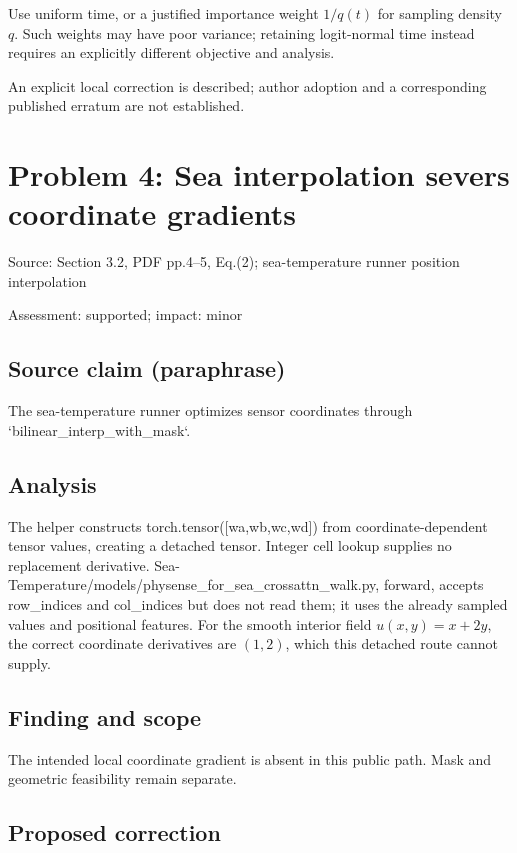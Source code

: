 \documentclass[11pt]{article}
\begin{document}
Use uniform time, or a justified importance weight \(1/q(t)\) for sampling density \(q\). Such weights may have poor variance; retaining logit-normal time instead requires an explicitly different objective and analysis.

An explicit local correction is described; author adoption and a corresponding published erratum are not established.

\section*{Problem 4: Sea interpolation severs coordinate gradients}

Source: Section 3.2, PDF pp.4–5, Eq.(2); sea-temperature runner position interpolation

Assessment: supported; impact: minor

\subsection*{Source claim (paraphrase)}

The sea-temperature runner optimizes sensor coordinates through `bilinear\_interp\_with\_mask`.

\subsection*{Analysis}

The helper constructs torch.tensor([wa,wb,wc,wd]) from coordinate-dependent tensor values, creating a detached tensor. Integer cell lookup supplies no replacement derivative. Sea-Temperature/models/physense\_for\_sea\_crossattn\_walk.py, forward, accepts row\_indices and col\_indices but does not read them; it uses the already sampled values and positional features. For the smooth interior field \(u(x,y)=x+2y\), the correct coordinate derivatives are \((1,2)\), which this detached route cannot supply.

\subsection*{Finding and scope}

The intended local coordinate gradient is absent in this public path. Mask and geometric feasibility remain separate.

\subsection*{Proposed correction}
\end{document}

